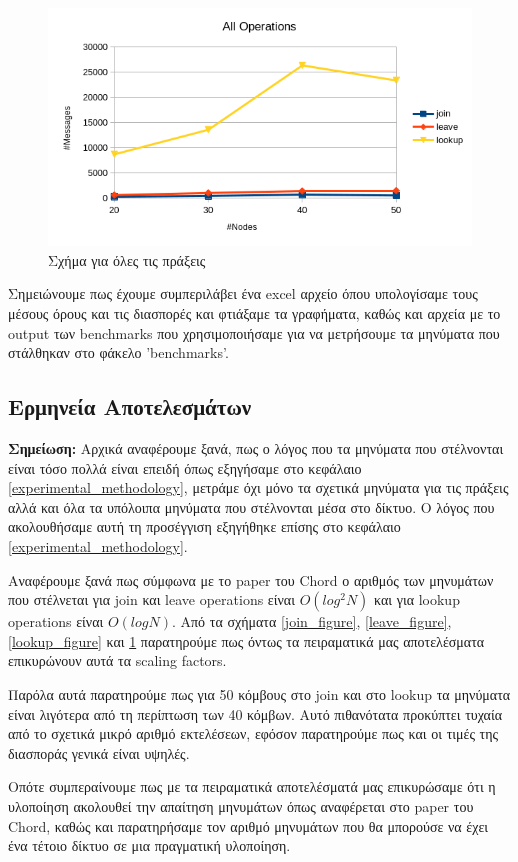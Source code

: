 \documentclass[12pt,a4paper]{article}
\begin{document}
\begin{figure}[H]
	\centering
	\includegraphics[scale=0.6]{./images/all.png}
	\caption{Σχήμα για όλες τις πράξεις}
	\label{all_figure}
\end{figure}

Σημειώνουμε πως έχουμε συμπεριλάβει ένα excel αρχείο όπου υπολογίσαμε τους μέσους όρους και τις διασπορές και φτιάξαμε τα γραφήματα, καθώς και αρχεία με το output των benchmarks που χρησιμοποιήσαμε για να μετρήσουμε τα μηνύματα που στάλθηκαν στο φάκελο 'benchmarks'.

\subsection{Ερμηνεία Αποτελεσμάτων}

\textbf{Σημείωση:} Αρχικά αναφέρουμε ξανά, πως ο λόγος που τα μηνύματα που στέλνονται είναι τόσο πολλά είναι επειδή όπως εξηγήσαμε στο κεφάλαιο \ref{experimental_methodology}, μετράμε όχι μόνο τα σχετικά μηνύματα για τις πράξεις αλλά και όλα τα υπόλοιπα μηνύματα που στέλνονται μέσα στο δίκτυο. Ο λόγος που ακολουθήσαμε αυτή τη προσέγγιση εξηγήθηκε επίσης στο κεφάλαιο \ref{experimental_methodology}.

Αναφέρουμε ξανά πως σύμφωνα με το paper του Chord ο αριθμός των μηνυμάτων που στέλνεται για join και leave operations είναι $O(log^2N)$ και για lookup operations είναι $O(logN)$. Από τα σχήματα \ref{join_figure}, \ref{leave_figure}, \ref{lookup_figure} και \ref{all_figure} παρατηρούμε πως όντως τα πειραματικά μας αποτελέσματα επικυρώνουν αυτά τα scaling factors.

Παρόλα αυτά παρατηρούμε πως για 50 κόμβους στο join και στο lookup τα μηνύματα είναι λιγότερα από τη περίπτωση των 40 κόμβων. Αυτό πιθανότατα προκύπτει τυχαία από το σχετικά μικρό αριθμό εκτελέσεων, εφόσον παρατηρούμε πως και οι τιμές της διασποράς γενικά είναι υψηλές.

Οπότε συμπεραίνουμε πως με τα πειραματικά αποτελέσματά μας επικυρώσαμε ότι η υλοποίηση ακολουθεί την απαίτηση μηνυμάτων όπως αναφέρεται στο paper του Chord, καθώς και παρατηρήσαμε τον αριθμό μηνυμάτων που θα μπορούσε να έχει ένα τέτοιο δίκτυο σε μια πραγματική υλοποίηση.
\end{document}
